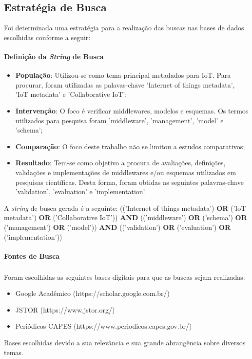 \subsection{Estratégia de Busca}
\quad Foi determinada uma estratégia para a realização das buscas nas bases de dados escolhidas conforme a seguir:

\paragraph{Definição da \textit{String} de Busca}
\begin{itemize}
  \item \textbf{População}: Utilizou-se como tema principal metadados para \acrshort{IoT}. Para procurar, foram utilizadas as palavas-chave 'Internet of things metadata', 'IoT metadata' e 'Collaborative IoT';
  \item \textbf{Intervenção}: O foco é verificar middlewares, modelos e esquemas. Os termos utilizados para pesquisa foram 'middleware', 'management', 'model' e 'schema';
  \item \textbf{Comparação}: O foco deste trabalho não se limitou a estudos comparativos;
  \item \textbf{Resultado}: Tem-se como objetivo a procura de avaliações, definições, validações e implementações de middlewares e/ou esquemas utilizados em pesquisas científicas. Desta forma, foram obtidas as seguintes palavras-chave
  'validation', 'evaluation' e 'implementation'.
\end{itemize}

\quad A \textit{string} de busca gerada é a seguinte:
(('Internet of things metadata') \textbf{OR} ('IoT metadata') \textbf{OR} ('Collaborative IoT')) \textbf{AND} (('middleware') \textbf{OR} ('schema') \textbf{OR} ('management') \textbf{OR} ('model')) \textbf{AND} (('validation') \textbf{OR} ('evaluation') \textbf{OR} ('implementation'))

\paragraph{Fontes de Busca}
\subparagraph{}
 Foram escolhidas as seguintes bases digitais para que as buscas sejam realizadas:
\begin{itemize}
  \item Google Acadêmico (https://scholar.google.com.br/)
  \item JSTOR (https://www.jstor.org/)
  \item Periódicos CAPES (https://www.periodicos.capes.gov.br/)
\end{itemize}
\quad Bases escolhidas devido a sua relevância e sua grande abrangência sobre diversos temas.
\pagebreak
